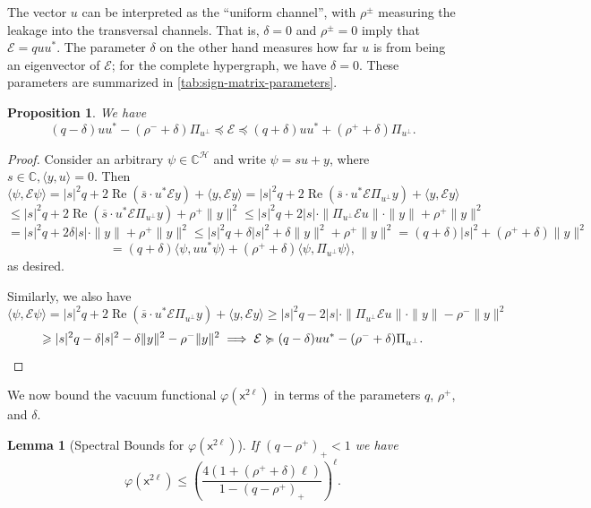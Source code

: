 \documentclass
[11pt,letterpaper]
{article}
\newtheorem{lemma}[theorem]{Lemma}
\newtheorem{proposition}[theorem]{Proposition}
\theoremstyle{definition}
\renewcommand{\bar}{\overline}
\newcommand{\sfx}{\mathsf x}
\newcommand{\cE}{{\mathcal E}}
\newcommand{\1}{\mathbf{1}}
\newcommand{\C}{\mathbb C}
\newcommand{\cH}{\mathcal H}
\renewcommand{\geq}{\geqslant}
\renewcommand{\leq}{\leqslant}
\renewcommand{\preceq}{\preccurlyeq}
\renewcommand{\succeq}{\succcurlyeq}
\newcommand{\Ree}{\operatorname{Re}}
\begin{document}
The vector $u$ can be interpreted as the ``uniform channel'', with $\rho^{\pm}$ measuring the leakage into the transversal channels. That is, $\delta=0$ and $\rho^{\pm} = 0$ imply that $\cE = q uu^*$. The parameter $\delta$ on the other hand measures how far $u$ is from being an eigenvector of $\cE$; for the complete hypergraph, we have $\delta=0$. These parameters are summarized in \cref{tab:sign-matrix-parameters}.
\begin{proposition}\label{prop:cE-dom}
We have
    \[(q - \delta)uu^* - (\rho^- + \delta)\Pi_{u^\perp}\preceq\cE\preceq(q + \delta)uu^* + (\rho^+ + \delta)\Pi_{u^\perp}.\]
\end{proposition}
\begin{proof}
    Consider an arbitrary $\psi\in\C^\cH$ and write $\psi = s u + y$, where $s\in\C, \langle y, u\rangle = 0$. Then 
    \[\langle\psi, \cE\psi\rangle = |s|^2q + 2\Ree(\bar{s}\cdot u^*\cE y) + \langle y, \cE y\rangle = |s|^2q + 2\Ree(\bar{s}\cdot u^*\cE\Pi_{u^\perp}y) + \langle y, \cE y\rangle\] 
    \[\leq |s|^2q + 2\Ree(\bar{s}\cdot u^*\cE\Pi_{u^\perp}y) + \rho^+\|y\|^2\leq |s|^2q + 2|s|\cdot\|\Pi_{u^\perp}\cE u\|\cdot\|y\| + \rho^+\|y\|^2\] 
    \[= |s|^2q + 2\delta|s|\cdot\|y\| + \rho^+\|y\|^2\leq |s|^2q + \delta|s|^2 + \delta\|y\|^2 + \rho^+\|y\|^2 = (q + \delta)|s|^2 + (\rho^+ + \delta)\|y\|^2\] 
    \[= (q + \delta)\langle\psi, uu^*\psi\rangle + (\rho^+ + \delta)\langle\psi, \Pi_{u^\perp}\psi\rangle,\]
    as desired.

    Similarly, we also have
    \[\langle\psi, \cE\psi\rangle = |s|^2q + 2\Ree(\bar{s}\cdot u^*\cE\Pi_{u^\perp}y) + \langle y, \cE y\rangle\geq |s|^2q - 2|s|\cdot\|\Pi_{u^\perp}\cE u\|\cdot\|y\| - \rho^-\|y\|^2\] 
    \[\geq |s|^2q - \delta|s|^2 - \delta\|y\|^2 - \rho^-\|y\|^2\implies\cE\succeq(q - \delta)uu^* - (\rho^- + \delta)\Pi_{u^\perp}.\qedhere\]
\end{proof}
We now bound the vacuum functional $\varphi(\sfx^{2\ell})$ in terms of the parameters $q$, $\rho^+$, and $\delta$.
\begin{lemma}[Spectral Bounds for $\varphi(\sfx^{2\ell})$]\label{lem:varphi-spectral-dom}
If $(q - \rho^+)_+ < 1$ we have    
\[\varphi(\sfx^{2\ell})\leq\left(\frac{4(1 + (\rho^+ + \delta)\ell)}{1 - (q - \rho^+)_+}\right)^\ell.\]
\end{lemma}
\end{document}

